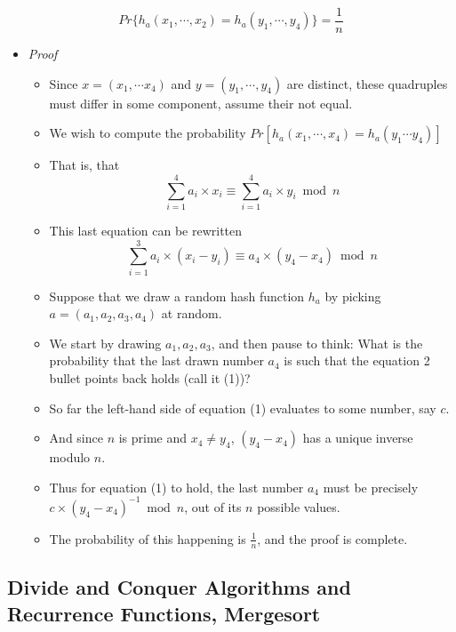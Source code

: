 \documentclass[a4paper,11pt]{article}
\begin{document}
\begin{enumerate}
\begin{description}
  \[Pr \lbrace h_a (x_1, \cdots, x_2) = h_a (y_1, \cdots, y_4) \rbrace = \frac{1}{n}\]
  \end{description}

  \begin{itemize}
  \itemsep1pt\parskip0pt
  \item
    \emph{Proof}

    \begin{itemize}
    \item
      Since $x = (x_1, \cdots x_4)$ and $y = (y_1, \cdots, y_4)$ are
      distinct, these quadruples must differ in some component, assume
      their not equal.
    \item
      We wish to compute the probability
      $Pr[h_a(x_1, \cdots, x_4) = h_a (y_1 \cdots y_4)]$
    \item
      That is, that
      \[ \sum_{i = 1}^{4} a_i \times x_i \equiv \sum_{i = 1}^4 a_i \times y_i \bmod n \]
    \item
      This last equation can be rewritten
      \[\sum_{i = 1}^{3} a_i \times (x_i - y_i) \equiv a_4 \times (y_4 - x_4) \bmod n \]
    \item
      Suppose that we draw a random hash function $h_a$ by picking
      $a = (a_1, a_2, a_3, a_4)$ at random.
    \item
      We start by drawing $a_1, a_2, a_3$, and then pause to think: What
      is the probability that the last drawn number $a_4$ is such that
      the equation 2 bullet points back holds (call it (1))?
    \item
      So far the left-hand side of equation (1) evaluates to some
      number, say $c$.
    \item
      And since $n$ is prime and $x_4 \neq y_4$, $(y_4 - x_4)$ has a
      unique inverse modulo $n$.
    \item
      Thus for equation (1) to hold, the last number $a_4$ must be
      precisely $c \times (y_4 - x_4)^{-1} \bmod n$, out of its $n$
      possible values.
    \item
      The probability of this happening is $\frac{1}{n}$, and the proof
      is complete.
    \end{itemize}
  \end{itemize}
\end{enumerate}

\subsection{Divide and Conquer Algorithms and Recurrence Functions,
Mergesort}\label{divide-and-conquer-algorithms-and-recurrence-functions-mergesort}
\end{document}
